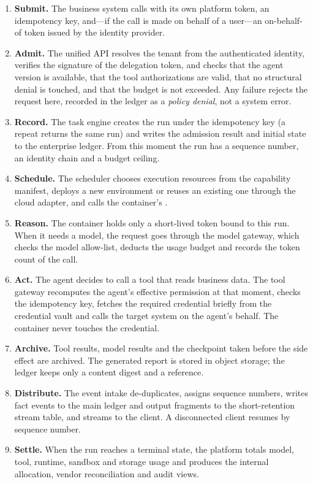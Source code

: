 \begin{enumerate}
  \item \textbf{Submit.} The business system calls  with its own platform token, an idempotency key, and---if the call is made on behalf of a user---an on-behalf-of token issued by the identity provider.
  \item \textbf{Admit.} The unified API resolves the tenant from the authenticated identity, verifies the signature of the delegation token, and checks that the agent version is available, that the tool authorizations are valid, that no structural denial is touched, and that the budget is not exceeded. Any failure rejects the request here, recorded in the ledger as a \emph{policy denial}, not a system error.
  \item \textbf{Record.} The task engine creates the run under the idempotency key (a repeat returns the same run) and writes the admission result and initial state to the enterprise ledger. From this moment the run has a sequence number, an identity chain and a budget ceiling.
  \item \textbf{Schedule.} The scheduler chooses execution resources from the capability manifest, deploys a new environment or reuses an existing one through the cloud adapter, and calls the container's .
  \item \textbf{Reason.} The container holds only a short-lived token bound to this run. When it needs a model, the request goes through the model gateway, which checks the model allow-list, deducts the usage budget and records the token count of the call.
  \item \textbf{Act.} The agent decides to call a tool that reads business data. The tool gateway recomputes the agent's effective permission at that moment, checks the idempotency key, fetches the required credential briefly from the credential vault and calls the target system on the agent's behalf. The container never touches the credential.
  \item \textbf{Archive.} Tool results, model results and the checkpoint taken before the side effect are archived. The generated report is stored in object storage; the ledger keeps only a content digest and a reference.
  \item \textbf{Distribute.} The event intake de-duplicates, assigns sequence numbers, writes fact events to the main ledger and output fragments to the short-retention stream table, and streams to the client. A disconnected client resumes by sequence number.
  \item \textbf{Settle.} When the run reaches a terminal state, the platform totals model, tool, runtime, sandbox and storage usage and produces the internal allocation, vendor reconciliation and audit views.
\end{enumerate}

